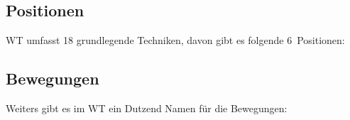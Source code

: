 \documentclass[a4paper,12pt]{scrartcl}
\begin{document}
\subsection{Positionen}

WT umfasst 18 grundlegende Techniken, davon gibt es folgende 6~Positionen:

\subsection{Bewegungen}
Weiters gibt es im WT ein Dutzend Namen f\"ur die Bewegungen:









\end{document}
